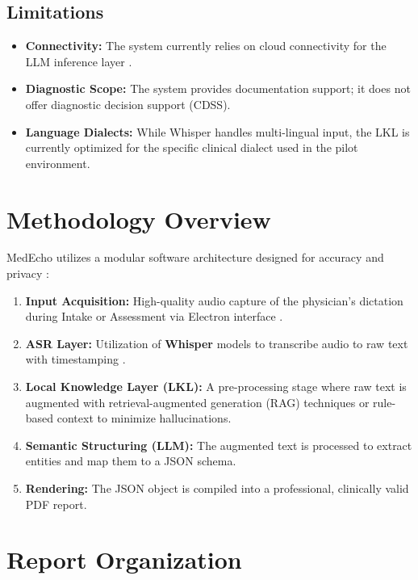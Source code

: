 \subsection*{Limitations}
\begin{itemize}
    \item \textbf{Connectivity:} The system currently relies on cloud connectivity for the LLM inference layer \cite{achiam2023gpt}.
    \item \textbf{Diagnostic Scope:} The system provides documentation support; it does not offer diagnostic decision support (CDSS).
    \item \textbf{Language Dialects:} While Whisper handles multi-lingual input, the LKL is currently optimized for the specific clinical dialect used in the pilot environment.
\end{itemize}

\section{Methodology Overview}\label{sec:intro:method}

MedEcho utilizes a modular software architecture designed for accuracy and privacy \cite{sommerville2011software}:

\begin{enumerate}
    \item \textbf{Input Acquisition:} High-quality audio capture of the physician's dictation during Intake or Assessment via Electron interface \cite{electron2024}.
    \item \textbf{ASR Layer:} Utilization of \textbf{Whisper} models to transcribe audio to raw text with timestamping \cite{radford2023robust}.
    \item \textbf{Local Knowledge Layer (LKL):} A pre-processing stage where raw text is augmented with retrieval-augmented generation (RAG) techniques \cite{lewis2020retrieval} or rule-based context to minimize hallucinations.
    \item \textbf{Semantic Structuring (LLM):} The augmented text is processed to extract entities and map them to a JSON schema.
    \item \textbf{Rendering:} The JSON object is compiled into a professional, clinically valid PDF report.
\end{enumerate}

\section{Report Organization}\label{sec:intro:organization}

